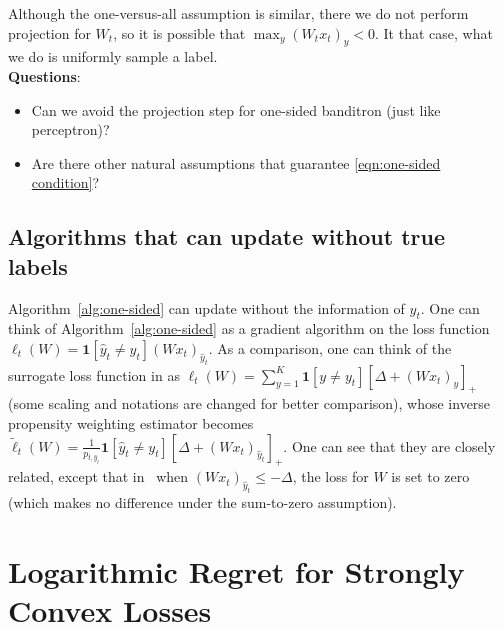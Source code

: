 \documentclass{article}
\newcommand{\one}{\boldsymbol{1}}
\begin{document}
Although the one-versus-all assumption is similar, there we do not perform projection for $W_t$, so it is possible that $\max_y (W_tx_t)_y < 0$. It that case, what we do is uniformly sample a label.\\

\textbf{Questions}:
\begin{itemize}
\item Can we avoid the projection step for one-sided banditron (just like perceptron)?
\item Are there other natural assumptions that guarantee \eqref{eqn:one-sided condition}? 
\end{itemize}

\subsection{Algorithms that can update without true labels}
Algorithm~\ref{alg:one-sided} can update without the information of $y_t$. One can think of Algorithm~\ref{alg:one-sided} as a gradient algorithm  on the loss function $\ell_t(W) = \one[\hat{y}_t\neq y_t](Wx_t)_{\hat{y}_t}$. As a comparison, one can think of the surrogate loss function in \cite{2018arXiv180610745F} as $\ell_t(W)=\sum_{y=1}^K \one[y\neq y_t][\Delta+(Wx_t)_y]_+ $ (some scaling and notations are changed for better comparison), whose inverse propensity weighting estimator becomes $\tilde{\ell}_t(W)= \frac{1}{p_{t,\hat{y}_t}}\one[\hat{y}_t\neq y_t][\Delta+(Wx_t)_{
\hat{y}_t}]_+$. One can see that they are closely related, except that in~\cite{2018arXiv180610745F}
when $(Wx_t)_{\hat{y}_t}\leq -\Delta$, the loss for $W$ is set to zero (which makes no difference under the sum-to-zero assumption). 


\section{Logarithmic Regret for Strongly Convex Losses}
\end{document}

